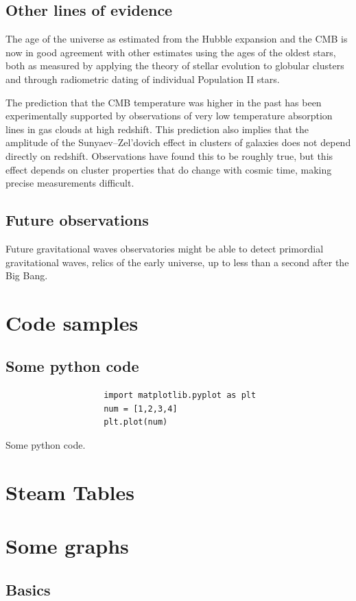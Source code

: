 \documentclass[14pt, oneside]{book}
\begin{document}
		\section{Other lines of evidence}
			The age of the universe as estimated from the Hubble expansion and the CMB is now in good agreement with other estimates using the ages of the oldest stars, both as measured by applying the theory of stellar evolution to globular clusters and through radiometric dating of individual Population II stars.
			
			The prediction that the CMB temperature was higher in the past has been experimentally supported by observations of very low temperature absorption lines in gas clouds at high redshift. This prediction also implies that the amplitude of the Sunyaev–Zel'dovich effect in clusters of galaxies does not depend directly on redshift. Observations have found this to be roughly true, but this effect depends on cluster properties that do change with cosmic time, making precise measurements difficult.
			
		\section{Future observations}
			Future gravitational waves observatories might be able to detect primordial gravitational waves, relics of the early universe, up to less than a second after the Big Bang. 

	\chapter{Code samples} %
		\section{Some python code}
			\begin{listing}[H]
				\centering
				\begin{verbatim}
					import matplotlib.pyplot as plt
					num = [1,2,3,4]
					plt.plot(num)
				\end{verbatim}
				\caption{Some python code.}
				\label{lst:python}
			\end{listing}
	
	\chapter{Steam Tables} %
		
	
	\chapter{Some graphs} %
		\section{Basics}

	
	
\end{document}
